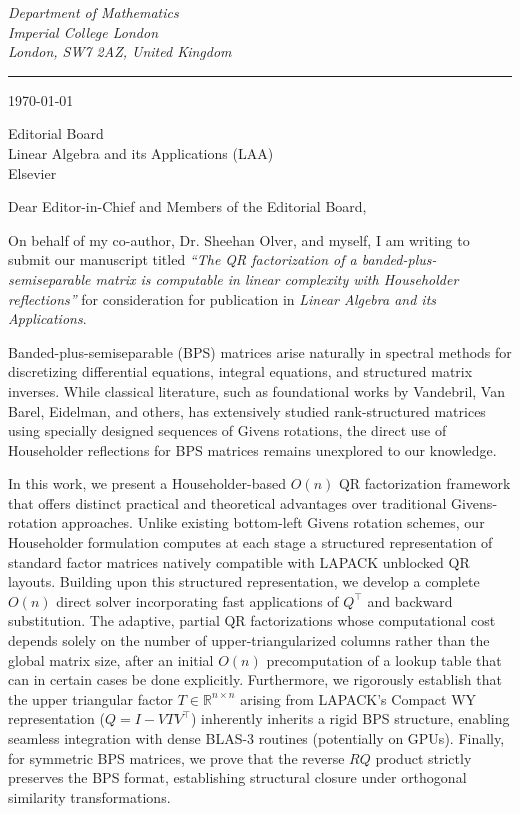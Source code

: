 \documentclass[11pt]{article}
\begin{document}
{\small\it
Department of Mathematics \\
Imperial College London \\
London, SW7 2AZ, United Kingdom
}

\vspace{-0.6em}
\rule{\textwidth}{0.8pt}

\vspace{0.4em}
\today

\vspace{0.4em}
Editorial Board \\
Linear Algebra and its Applications (LAA) \\
Elsevier

\vspace{0.4em}
Dear Editor-in-Chief and Members of the Editorial Board,

On behalf of my co-author, Dr. Sheehan Olver, and myself, I am writing to submit our manuscript titled \textit{``The QR factorization of a banded-plus-semiseparable matrix is computable in linear complexity with Householder reflections''} for consideration for publication in \textit{Linear Algebra and its Applications}.

Banded-plus-semiseparable (BPS) matrices arise naturally in spectral methods for discretizing differential equations, integral equations, and structured matrix inverses. While classical literature, such as foundational works by Vandebril, Van Barel, Eidelman, and others, has extensively studied rank-structured matrices using specially designed sequences of Givens rotations, the direct use of Householder reflections for BPS matrices remains unexplored to our knowledge.

In this work, we present a Householder-based $O(n)$ QR factorization framework that offers distinct practical and theoretical advantages over traditional Givens-rotation approaches. Unlike existing bottom-left Givens rotation schemes, our Householder formulation computes at each stage a structured representation of standard factor matrices natively compatible with LAPACK unblocked QR layouts. Building upon this structured representation, we develop a complete $O(n)$ direct solver incorporating fast applications of $Q^\top$ and backward substitution. The adaptive, partial QR factorizations whose computational cost depends solely on the number of upper-triangularized columns rather than the global matrix size, after an initial $O(n)$ precomputation of a lookup table that can in certain cases be done explicitly. Furthermore, we rigorously establish that the upper triangular factor $T \in \mathbb{R}^{n \times n}$ arising from LAPACK's Compact WY representation ($Q = I - V T V^\top$) inherently inherits a rigid BPS structure, enabling seamless integration with dense BLAS-3 routines (potentially on GPUs). Finally, for symmetric BPS matrices, we prove that the reverse $RQ$ product strictly preserves the BPS format, establishing structural closure under orthogonal similarity transformations.
\end{document}
